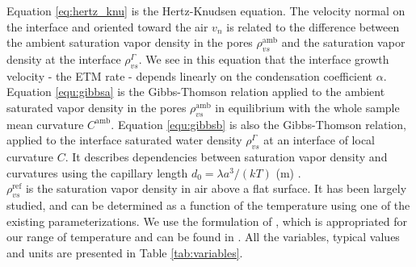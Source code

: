 \documentclass[draft,ms]{agujournal2019}
\begin{document}
\noindent Equation \eqref{eq:hertz_knu} is the Hertz-Knudsen equation. The velocity normal on the interface and oriented toward the air $v_n$ is related to the difference between the ambient saturation vapor density in the pores $\rho_{vs}^{\mathrm{amb}}$ and the saturation vapor density at the interface $\rho_{vs}^{\Gamma}$. We see in this equation that the interface growth velocity - the ETM rate - depends linearly on the condensation coefficient $\alpha$.\\

\noindent Equation \eqref{equ:gibbsa} is the Gibbs-Thomson relation applied to the ambient saturated vapor density in the pores $\rho_{vs}^{\mathrm{amb}}$ in equilibrium with the whole sample mean curvature $C^{\mathrm{amb}}$. Equation \eqref{equ:gibbsb} is also the Gibbs-Thomson relation, applied to the interface saturated water density $\rho_{vs}^{\Gamma}$ at an interface of local curvature $C$. It describes dependencies between saturation vapor density and curvatures using the capillary length $d_0 = \lambda a^3/(k T)$ (m) \cite{kaempfer_phase-field_2009}.\\ 
  
 \noindent $\rho_{vs}^\mathrm{ref}$ is the saturation vapor density in air above a flat surface. It has been largely studied, and can be determined as a function of the temperature using one of the existing parameterizations. We use the formulation of , which is appropriated for our range of temperature and can be found in . All the variables, typical values and units are presented in Table \ref{tab:variables}.
\end{document}
